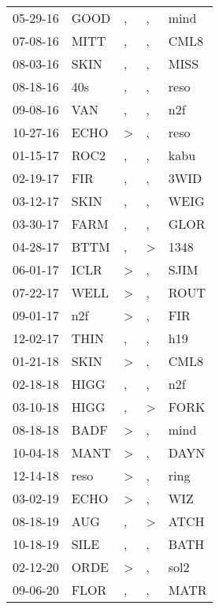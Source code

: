 \begin{supertabular}{lllll}
 05-29-16 &   GOOD &                , &             , &   mind \\
 07-08-16 &   MITT &                , &             , &   CML8 \\
 08-03-16 &   SKIN &                , &             , &   MISS \\
 08-18-16 &    40s &                , &             , &   reso \\
 09-08-16 &    VAN &                , &             , &    n2f \\
 10-27-16 &   ECHO &     \textgreater &             , &   reso \\
 01-15-17 &   ROC2 &                , &             , &   kabu \\
 02-19-17 &    FIR &                , &             , &   3WID \\
 03-12-17 &   SKIN &                , &             , &   WEIG \\
 03-30-17 &   FARM &                , &             , &   GLOR \\
 04-28-17 &   BTTM &                , &  \textgreater &   1348 \\
 06-01-17 &   ICLR &     \textgreater &             , &   SJIM \\
 07-22-17 &   WELL &     \textgreater &             , &   ROUT \\
 09-01-17 &    n2f &     \textgreater &             , &    FIR \\
 12-02-17 &   THIN &                , &             , &    h19 \\
 01-21-18 &   SKIN &     \textgreater &             , &   CML8 \\
 02-18-18 &   HIGG &                , &             , &    n2f \\
 03-10-18 &   HIGG &                , &  \textgreater &   FORK \\
 08-18-18 &   BADF &     \textgreater &             , &   mind \\
 10-04-18 &   MANT &     \textgreater &             , &   DAYN \\
 12-14-18 &   reso &     \textgreater &             , &   ring \\
 03-02-19 &   ECHO &     \textgreater &             , &    WIZ \\
 08-18-19 &    AUG &                , &  \textgreater &   ATCH \\
 10-18-19 &   SILE &                , &             , &   BATH \\
 02-12-20 &   ORDE &     \textgreater &             , &   sol2 \\
 09-06-20 &   FLOR &                , &             , &   MATR \\
\end{supertabular}
